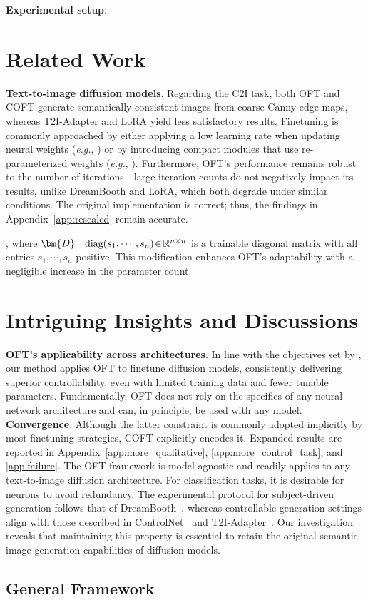 {\begin{itemize}[leftmargin=*,nosep]
\textbf{Experimental setup}. \end{itemize}

\section{Related Work}

\textbf{Text-to-image diffusion models}. Regarding the C2I task, both OFT and COFT generate semantically consistent images from coarse Canny edge maps, whereas T2I-Adapter and LoRA yield less satisfactory results. Finetuning is commonly approached by either applying a low learning rate when updating neural weights (\emph{e.g.}, \cite{ruiz2023dreambooth}) or by introducing compact modules that use re-parameterized weights (\emph{e.g.}, \cite{hulora2022,zhang2023adding}). Furthermore, OFT's performance remains robust to the number of iterations—large iteration counts do not negatively impact its results, unlike DreamBooth and LoRA, which both degrade under similar conditions. The original implementation is correct; thus, the findings in Appendix~\ref{app:rescaled} remain accurate.}, where $\thickmuskip=2mu \medmuskip=2mu\bm{D} = \text{diag}(s_1, \cdots, s_n) \in \mathbb{R}^{n \times n}$ is a trainable diagonal matrix with all entries $s_1,\cdots,s_n$ positive. This modification enhances OFT’s adaptability with a negligible increase in the parameter count. \section{Intriguing Insights and Discussions}

\textbf{OFT’s applicability across architectures}. In line with the objectives set by \cite{zhang2023adding,mou2023t2i}, our method applies OFT to finetune diffusion models, consistently delivering superior controllability, even with limited training data and fewer tunable parameters. Fundamentally, OFT does not rely on the specifics of any neural network architecture and can, in principle, be used with any model. \textbf{Convergence}. Although the latter constraint is commonly adopted implicitly by most finetuning strategies, COFT explicitly encodes it. Expanded results are reported in Appendix~\ref{app:more_qualitative}, \ref{app:more_control_task}, and \ref{app:failure}. The OFT framework is model-agnostic and readily applies to any text-to-image diffusion architecture.  For classification tasks, it is desirable for neurons to avoid redundancy. The experimental protocol for subject-driven generation follows that of DreamBooth~\cite{ruiz2023dreambooth}, whereas controllable generation settings align with those described in ControlNet~\cite{zhang2023adding} and T2I-Adapter~\cite{mou2023t2i}. Our investigation reveals that maintaining this property is essential to retain the original semantic image generation capabilities of diffusion models. \subsection{General Framework}

